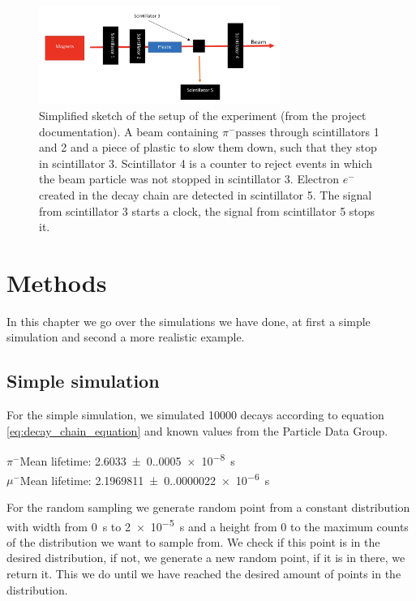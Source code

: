 \documentclass[11pt, a4paper, oneside]{book}
\newcommand{\electron}{$e^{-}$}
\newcommand{\pion}{$\pi^{-}$}
\newcommand{\muon}{$\mu^{-}$}
\begin{document}
\begin{figure}[h]
\begin{center}
\includegraphics[width=0.7\textwidth]{images/experimental_setup.png}
\end{center}
\caption{Simplified sketch of the setup of the experiment (from the project documentation). A beam containing \pion passes through scintillators 1 and 2 and a piece of plastic to slow them down, such that they stop in scintillator 3. Scintillator 4 is a counter to reject events in which the beam particle was not stopped in scintillator 3. Electron \electron created in the decay chain are detected in scintillator 5. The signal from scintillator 3 starts a clock, the signal from scintillator 5 stops it.}
\label{fig:experimental_setup}
\end{figure}


\FloatBarrier
\chapter{Methods}

In this chapter we go over the simulations we have done, at first a simple simulation and second a more realistic example.

\section{Simple simulation}

For the simple simulation, we simulated \num{10000} decays according to equation \ref{eq:decay_chain_equation} and known values from the Particle Data Group. \cite{ParticleDataGroup:2024cfk}

\pion Mean lifetime: \qty{2.6033(0.0005)e-8}{\s} \\
\muon Mean lifetime: \qty{2.1969811(0.0000022)e-6}{\s}

For the random sampling we generate random point from a constant distribution with width from \qty{0}{\s} to \qty{2e-5}{\s} and a height from 0 to the maximum counts of the distribution we want to sample from. We check if this point is in the desired distribution, if not, we generate a new random point, if it is in there, we return it. This we do until we have reached the desired amount of points in the distribution.
\end{document}
